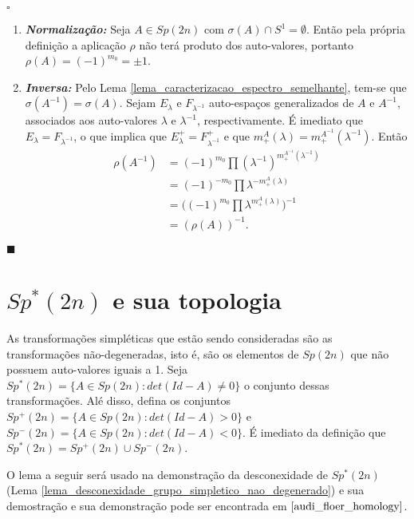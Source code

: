 \documentclass[12pt]{book}
\newenvironment{prova}[1]{$\square$ #1}{\hfill$\blacksquare$}
\newcommand{\autoespaco}[1]{E_{#1}}
\newcommand{\bigparenteses}[1]{\Big( #1 \Big) }
\newcommand{\circulo}{S^{1}}
\newcommand{\espectrooperador}[1]{\sigma(#1)}
\newcommand{\gruposimpletico}[1]{Sp(#1)}
\newcommand{\gruposimpleticonaodegenerado}[1]{Sp^{#1}(2n)}
\begin{document}
\begin{prova}
\begin{enumerate}
			\item \textbf{\textit{Normalização:}} Seja $A\in \gruposimpletico{2n}$ com $\sigma(A)\cap \circulo = \emptyset$. Então pela própria definição a aplicação $\rho$ não terá produto dos auto-valores, portanto $\rho(A) = (-1)^{m_{0}} = \pm 1$. 
			
			\item \textbf{\textit{Inversa:}} 	Pelo Lema \ref{lema_caracterizacao_espectro_semelhante}, tem-se que $\espectrooperador{A^{-1}} = \espectrooperador{A}$. Sejam $\autoespaco{\lambda}$ e $F_{\lambda^{-1}}$ auto-espaços generalizados de $A$ e $A^{-1}$, associados aos auto-valores $\lambda$ e $\lambda^{-1}$, respectivamente. É imediato que $\autoespaco{\lambda} = F_{\lambda^{-1}}$, o que implica que $\autoespaco{\lambda}^{+} = F_{\lambda^{-1}}^{+}$ e que $m^{A}_{+}(\lambda) = m^{A^{-1}}_{+}(\lambda^{-1})$. Então
			$$
			\begin{aligned}
			\rho(A^{-1})
			&= (-1)^{m_{0}}\prod (\lambda^{-1})^{m_{+}^{A^{-1}}(\lambda^{-1})}
			\\
			&=(-1)^{-m_{0}}\prod \lambda^{-m_{+}^{A}(\lambda)}
			\\
			&=\bigparenteses{(-1)^{m_{0}}\prod \lambda^{m_{+}^{A}(\lambda)}}^{-1}
			\\
			&=(\rho(A)) ^{-1}.
			\end{aligned}
			$$
		\end{enumerate}
	\end{prova}
	
	\section{$\gruposimpleticonaodegenerado{*}$ e sua topologia}
	As transformações simpléticas que estão sendo consideradas são as transformações não-degeneradas, isto é, são os elementos de $\gruposimpletico{2n}$ que não possuem auto-valores iguais a 1. Seja $\gruposimpleticonaodegenerado{*}= \{ A \in \gruposimpletico{2n}: det(Id-A)\neq 0 \}$ o conjunto dessas transformações. Alé disso, defina os conjuntos $\gruposimpleticonaodegenerado{+}= \{ A \in \gruposimpletico{2n}: det(Id-A)> 0 \}$ e $\gruposimpleticonaodegenerado{-}= \{ A \in \gruposimpletico{2n}: det(Id-A)<0 \}$. É imediato da definição que $\gruposimpleticonaodegenerado{*}= \gruposimpleticonaodegenerado{+} \cup \gruposimpleticonaodegenerado{-} $.
	
	O lema a seguir será usado na demonstração da desconexidade de $\gruposimpleticonaodegenerado{*}$ (Lema \ref{lema_desconexidade_grupo_simpletico_nao_degenerado}) e sua demostração e sua demonstração pode ser encontrada em $\cite{audi_floer_homology}$.
	
\end{document}
